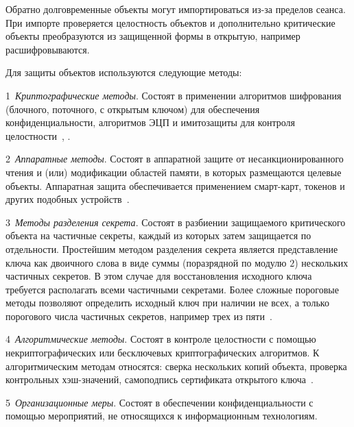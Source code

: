 Обратно долговременные объекты могут импортироваться из-за 
пределов сеанса. При импорте проверяется целостность 
объектов и дополнительно критические объекты преобразуются 
из защищенной формы в открытую, например расшифровываются.

Для защиты объектов используются следующие методы:

1~{\it Криптографические методы}. 
Состоят в применении алгоритмов шифрования 
(блочного, поточного, с открытым ключом)
для обеспечения конфиденциальности,
алгоритмов ЭЦП и имитозащиты для контроля 
целостности~,
.

2~{\it Аппаратные методы}. 
Состоят в аппаратной защите от несанкционированного
чтения и (или) модификации областей памяти,
в которых размещаются целевые объекты.
Аппаратная защита обеспечивается применением смарт-карт, токенов
и других подобных устройств~. 


3~{\it Методы разделения секрета}. 
Состоят в разбиении защищаемого критического объекта на частичные секреты, 
каждый из которых затем защищается по отдельности.
%
Простейшим методом разделения секрета является представление
ключа как двоичного слова в виде суммы (поразрядной по модулю $2$)
нескольких частичных секретов. 
В этом случае для восстановления исходного 
ключа требуется располагать всеми частичными секретами.
%
Более сложные пороговые методы позволяют 
определить исходный ключ при наличии не всех, 
а только порогового числа частичных секретов, 
например трех из пяти~.

4~{\it Алгоритмические методы}. 
Состоят в контроле целостности с помощью некриптографических или 
бесключевых криптографических алгоритмов.
К алгоритмическим методам относятся: 
сверка нескольких копий объекта, 
проверка контрольных хэш-значений,
самоподпись сертификата открытого ключа~.

5~{\it Организационные меры}. 
Состоят в обеспечении конфиденциальности с помощью мероприятий,
не относящихся к информационным технологиям.

